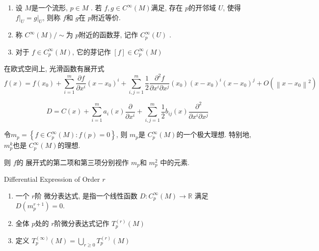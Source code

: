 \documentclass[../main.tex]{subfiles}
\begin{document}
\begin{definition}{}{}
\begin{enumerate}
    \item 设 \(  M  \)是一个流形, \(  p \in M  \) . 若 \(  f,g \in C^{\infty}\left( M \right)   \)满足, 存在 \(  p  \)的开邻域 \(  U  \), 使得 \(  \left. f \right|_{U} =  \left. g \right|_{U}  \), 则称 \(  f  \)和 \(  g  \)在 \(  p  \)附近等价. 
    \item 称 \(  C^{\infty}\left( M \right)/ \sim    \)为 \(  p  \)附近的函数芽, 记作 \(  C^{\infty}_{p}\left( U \right)   \) . 
    \item 对于 \(  f\in C^{\infty}_{p}\left( M \right)   \), 它的芽记作 \(  [f] \in C^{\infty}_{p}\left( M \right)   \)    
\end{enumerate}

\end{definition}

在欧式空间上, 光滑函数有展开式
\[
f\left( x \right)= f\left( x_0 \right)+ \sum _{i= 1}^{m} \frac{\partial f}{\partial x^{i}}  \left( x-x_0 \right)^{i} + \sum _{i,j= 1}^{m}\frac{1 }{2 }\frac{\partial ^{2}f}{\partial x^{i} \partial x^{j}}\left( x_0 \right)\left( x-x_0 \right)^{i}\left( x-x_0 \right)^{j}+ O\left( \left\| x-x_0 \right\|^{2} \right)      
\]

\[
    D =  C\left( x \right)+ \sum _{i= 1}^{m}a_{i}\left( x \right)\frac{\partial }{\partial x^{i}}+ \sum _{i,j= 1}^{m}\frac{1 }{2 }b_{ij}\left( x \right)\frac{\partial ^{2}}{\partial x^{i} \partial x^{j}}    
    \]

    \begin{definition}{}{}
        令\(  m_{p}= \left\{ f\in C^{\infty}_{p}\left( M \right):f\left( p \right)= 0   \right\}  \), 则 \(  m_{p}  \)是 \(  C^{\infty}_{p}\left( M \right)   \)的一个极大理想. 特别地, \(  m_{p}^{k}  \)也是 \(  C^{\infty}_{p}\left( M \right)   \)的理想.      
    \end{definition}
    则 \(  f  \)的 展开式的第二项和第三项分别视作 \(  m_{p}  \)和 \(  m_{p}^{2}  \)  中的元素.

    \begin{definition}{Differential Expression of Order \(  r  \) }{}
      \begin{enumerate}
        \item  一个 \(  r  \)阶 微分表达式, 是指一个线性函数 \(  D: C^{\infty}_{p}\left( M \right)\to \mathbb{R}    \) 满足 \(  D\left( m_{p}^{r+ 1} \right)= 0   \).  
        \item 全体 \(  p  \)处的 \(  r \)阶微分表达式记作 \(  T_{p}^{\left( r \right) }\left( M \right)   \)
        \item 定义 \(  T_{p}^{\left( \infty \right) }\left( M \right)= \bigcup _{r \ge 0} T_{p}^{\left( r \right) }\left( M \right)    \)    
      \end{enumerate}
      
    \end{definition}
\end{document}
